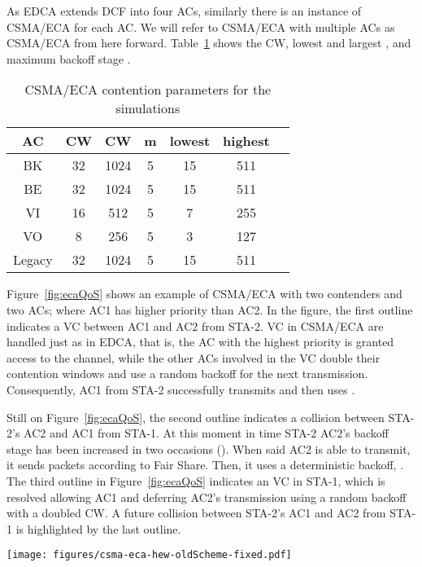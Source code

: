 \documentclass[a4paper]{article}
\begin{document}
As EDCA extends DCF into four ACs, similarly there is an instance of CSMA/ECA for each AC. We will refer to CSMA/ECA with multiple ACs as CSMA/ECA from here forward. Table~\ref{tab:newQoSparams} shows the CW, lowest and largest , and maximum backoff stage .

	\begin{table}[t]
		\centering
		\caption{CSMA/ECA contention parameters for the simulations}
		\label{tab:newQoSparams}
		\begin{tabular}{|c|c|c|c|c|c|c|}
			\hline
			{\bfseries AC} & {\bfseries CW} & {\bfseries CW} & {\bfseries m} & {\bfseries lowest } & {\bfseries highest }\\
			\hline
			BK		       &	32				&		1024		  & 		5	&			15		        &		511		\\
			BE		       &	32				&		1024		  &		5	&			15		        &		511		\\
			VI		       &	16				&		512		  & 		5	&			7		     	&		255		\\
			VO		       &	8				&		256		  & 		5	&			3		        &		127		\\
			Legacy	       &	32				&		1024		  & 		5	&			15		        &		511		\\
			\hline
		\end{tabular}
	\end{table}

Figure~\ref{fig:ecaQoS} shows an example of CSMA/ECA with two contenders and two ACs; where AC1 has higher priority than AC2. In the figure, the first outline indicates a VC between AC1 and AC2 from STA-2. VC in CSMA/ECA are handled just as in EDCA, that is, the AC with the highest priority is granted access to the channel, while the other ACs involved in the VC double their contention windows and use a random backoff for the next transmission. Consequently, AC1 from STA-2 successfully transmits and then uses .

Still on Figure~\ref{fig:ecaQoS}, the second outline indicates a collision between STA-2's AC2 and AC1 from STA-1. At this moment in time STA-2 AC2's backoff stage has been increased in two occasions (). When said AC2 is able to transmit, it sends  packets according to Fair Share. Then, it uses a deterministic backoff, . The third outline in Figure~\ref{fig:ecaQoS} indicates an VC in STA-1, which is resolved allowing AC1 and deferring AC2's transmission using a random backoff with a doubled CW. A future collision between STA-2's AC1 and AC2 from STA-1 is highlighted by the last outline.

	\begin{figure*}[tb]
	\centering
		\texttt{[image: figures/csma-eca-hew-oldScheme-fixed.pdf]}
		\caption{An example of the temporal evolution of CSMA/ECA in saturation (; )}
		\label{fig:ecaQoS}
	\end{figure*}
\end{document}
